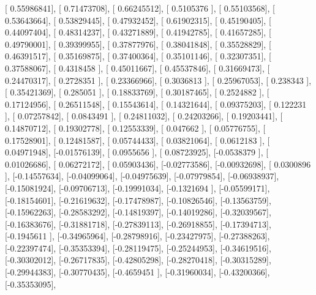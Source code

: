 \documentclass{article}
\begin{document}
       [ 0.55986841],
       [ 0.71473708],
       [ 0.66245512],
       [ 0.5105376 ],
       [ 0.55103568],
       [ 0.53643664],
       [ 0.53829445],
       [ 0.47932452],
       [ 0.61902315],
       [ 0.45190405],
       [ 0.44097404],
       [ 0.48314237],
       [ 0.43271889],
       [ 0.41942785],
       [ 0.41657285],
       [ 0.49790001],
       [ 0.39399955],
       [ 0.37877976],
       [ 0.38041848],
       [ 0.35528829],
       [ 0.46391517],
       [ 0.35169875],
       [ 0.37400364],
       [ 0.35101146],
       [ 0.32307351],
       [ 0.37588067],
       [ 0.4318458 ],
       [ 0.45011667],
       [ 0.45537846],
       [ 0.31669473],
       [ 0.24470317],
       [ 0.2728351 ],
       [ 0.23366966],
       [ 0.3036813 ],
       [ 0.25967053],
       [ 0.238343  ],
       [ 0.35421369],
       [ 0.285051  ],
       [ 0.18833769],
       [ 0.30187465],
       [ 0.2524882 ],
       [ 0.17124956],
       [ 0.26511548],
       [ 0.15543614],
       [ 0.14321644],
       [ 0.09375203],
       [ 0.122231  ],
       [ 0.07257842],
       [ 0.0843491 ],
       [ 0.24811032],
       [ 0.24203266],
       [ 0.19203441],
       [ 0.14870712],
       [ 0.19302778],
       [ 0.12553339],
       [ 0.047662  ],
       [ 0.05776755],
       [ 0.17528901],
       [ 0.12481587],
       [ 0.05744433],
       [ 0.03821064],
       [ 0.0612183 ],
       [ 0.04971948],
       [-0.01576139],
       [ 0.0955656 ],
       [ 0.08723925],
       [-0.0538379 ],
       [ 0.01026686],
       [ 0.06272172],
       [ 0.05903436],
       [-0.02773586],
       [-0.00932698],
       [ 0.0300896 ],
       [-0.14557634],
       [-0.04099064],
       [-0.04975639],
       [-0.07979854],
       [-0.06938937],
       [-0.15081924],
       [-0.09706713],
       [-0.19991034],
       [-0.1321694 ],
       [-0.05599171],
       [-0.18154601],
       [-0.21619632],
       [-0.17478987],
       [-0.10826546],
       [-0.13563759],
       [-0.15962263],
       [-0.28583292],
       [-0.14819397],
       [-0.14019286],
       [-0.32039567],
       [-0.16383676],
       [-0.31881718],
       [-0.27839113],
       [-0.26918855],
       [-0.17394713],
       [-0.1945611 ],
       [-0.34965964],
       [-0.28798916],
       [-0.23427975],
       [-0.27388263],
       [-0.22397474],
       [-0.35353394],
       [-0.28119475],
       [-0.25244953],
       [-0.34619516],
       [-0.30302012],
       [-0.26717835],
       [-0.42805298],
       [-0.28270418],
       [-0.30315289],
       [-0.29944383],
       [-0.30770435],
       [-0.4659451 ],
       [-0.31960034],
       [-0.43200366],
       [-0.35353095],
\end{document}
